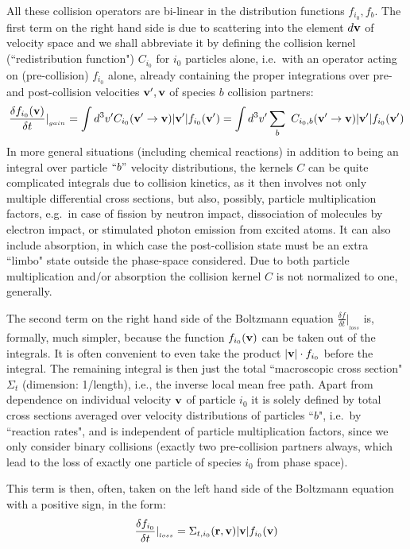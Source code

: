 All these collision operators are bi-linear in the distribution functions
$f_{i_0}, f_b$.
The first term on the right hand side is due to scattering into the element
$d\mathbf{v}$ of velocity space and we shall abbreviate it by defining the collision
kernel (``redistribution function") $C_{i_0}$ for $i_0$ particles alone, i.e.\
with an operator acting on (pre-collision) $f_{i_0}$ alone, already containing
the proper integrations over pre- and post-collision velocities $\mathbf{v}', \mathbf{v}$ of
species $b$ collision partners:
\begin{equation}
  \label{colkern}
  \frac{\delta f_{i_0}
    (\mathbf{v})}{\delta t}|_{_{gain}} = \int d^3{v}'	C_{i_0}(\mathbf{v}' \rightarrow \mathbf{v})
  |\mathbf{v}'| f_{i_0}(\mathbf{v}') = \int d^3{v}' \sum_b \ C_{i_0,b}(\mathbf{v}' \rightarrow \mathbf{v})
  |\mathbf{v}'| f_{i_0}(\mathbf{v}')
\end{equation}
In more general situations (including
chemical reactions) in addition to being an integral over particle $``b"$
velocity distributions, the kernels $C$ can be quite complicated integrals due
to collision kinetics, as it then involves not only multiple differential cross
sections, but also, possibly, particle multiplication factors, e.g.\ in case of
fission by neutron impact, dissociation of molecules by electron impact, or
stimulated photon emission from excited atoms.
It can also include absorption, in which case the post-collision state must be
an extra ``limbo" state outside the phase-space considered.
Due to both particle multiplication and/or absorption the collision kernel $C$
is not normalized to one, generally.

The second term on the right hand side of the Boltzmann equation $\frac{\delta
    f}{\delta t}|_{_{loss}}$ is, formally, much simpler, because the function
$f_{i_0}(\mathbf{v})$ can be taken out of the integrals.
It is often convenient to even take the product $|\mathbf{v}| \cdot f_{i_0}$ before
the integral.
The remaining integral is then just the total ``macroscopic cross section"
$\Sigma_t$ (dimension: 1/length), i.e., the inverse local mean free path.
Apart from dependence on individual velocity $\mathbf{v}$  of particle $i_0$ it is
solely defined by total cross sections averaged over velocity distributions of
particles ``$b$", i.e.\ by ``reaction rates", and is independent of particle
multiplication factors, since we only consider binary collisions (exactly two
pre-collision partners always, which lead to the loss of exactly one particle
of species $i_0$ from phase space).

This term is then, often, taken on the left hand side of the Boltzmann equation
with a positive sign, in the form:
\begin{equation}
  \label{extcoef}
  \frac{\delta f_{i_0}}{\delta t}|_{_{loss}}
  =
  \Sigma_{t,i_0}
  (\mathbf{r},\mathbf{v}) |\mathbf{v}| f_{i_0}(\mathbf{v})
\end{equation}

